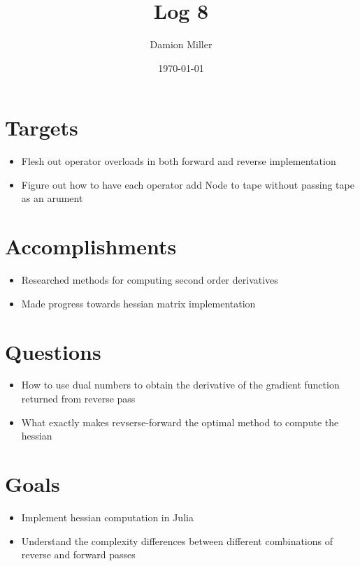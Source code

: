 \documentclass[12pt, letterpaper]{article}
\title{Log 8}
\author{Damion Miller}
\date{\today}
\begin{document}
\maketitle
\section*{Targets}
\begin{itemize}
\item Flesh out operator overloads in both forward and reverse implementation
\item Figure out how to have each operator add Node to tape without passing tape as an arument
\end{itemize}

\section*{Accomplishments}
\begin{itemize}
\item Researched methods for computing second order derivatives 
\item Made progress towards hessian matrix implementation
\end{itemize}

\section*{Questions}
\begin{itemize}
\item How to use dual numbers to obtain the derivative of the gradient function returned from reverse pass
\item What exactly makes revserse-forward the optimal method to compute the hessian
\end{itemize}

\section*{Goals}
\begin{itemize}
\item Implement hessian computation in Julia
\item Understand the complexity differences between different combinations of reverse and forward passes
\end{itemize}
\end{document}
